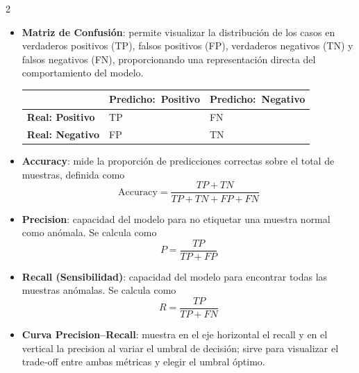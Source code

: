 \documentclass[11pt]{article}
\begin{document}
\begin{multicols}{2}
\vspace{-0.5em}
\setlength{\itemsep}{0.2em}
\begin{itemize}
     \item \textbf{Matriz de Confusión}: permite visualizar la distribución de los casos en verdaderos positivos (TP), falsos positivos (FP), verdaderos negativos (TN) y falsos negativos (FN), proporcionando una representación directa del comportamiento del modelo.
    \begin{table}[H]
    \centering
    \scriptsize
    \label{tab:confusion_example}
    \begin{tabular}{|l|p{1.45cm}|p{1.45cm}|}
        \hline
         & \textbf{Predicho:\ Positivo} & \textbf{Predicho:\ Negativo} \\ \hline
        \textbf{Real: Positivo} & TP & FN \\ \hline
        \textbf{Real: Negativo} & FP & TN \\ \hline
    \end{tabular}
    \end{table}

    \item \textbf{Accuracy}: mide la proporción de predicciones correctas sobre el total de muestras, definida como
    \begin{equation}
        \textstyle \text{Accuracy} = \frac{TP + TN}{TP + TN + FP + FN} \label{accuracy}
    \end{equation}     

    \item \textbf{Precision}: capacidad del modelo para no etiquetar una muestra normal como anómala. Se calcula como
    \vspace{-0.5em}
    \begin{equation}
        \textstyle P = \frac{TP}{TP + FP}
    \end{equation}

    \item \textbf{Recall (Sensibilidad)}: capacidad del modelo para encontrar todas las muestras anómalas. Se calcula como
    \vspace{-0.5em}
    \begin{equation}
        \textstyle R = \frac{TP}{TP + FN}
    \end{equation}

    \item \textbf{Curva Precision–Recall}: muestra en el eje horizontal el recall y en el vertical la precision al variar el umbral de decisión; sirve para visualizar el trade‑off entre ambas métricas y elegir el umbral óptimo.
    

\end{itemize}
\end{multicols}
\end{document}
